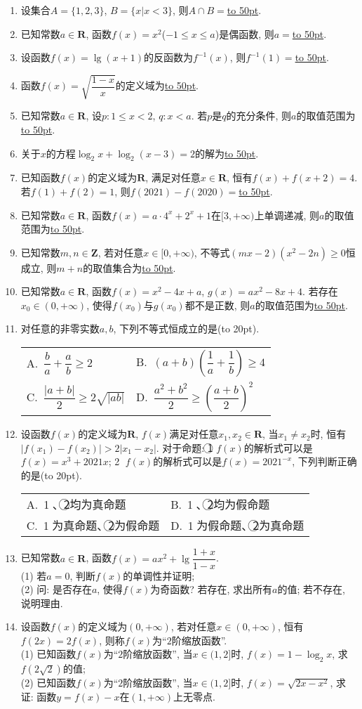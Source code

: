 \documentclass[10pt,a4paper]{article}
\newcommand{\blank}[1]{\underline{\hbox to #1pt{}}}
\newcommand{\bracket}[1]{(\hbox to #1pt{})}
\newcommand{\twoch}[4]{\par\begin{tabular}{p{.46\textwidth}p{.46\textwidth}}
A.~#1& B.~#2\\
C.~#3& D.~#4
\end{tabular}}
\begin{document}
\begin{enumerate}[1.]
\item 设集合$A=\{1,2,3\}$, $B=\{x|x<3\}$, 则$A\cap B=$\blank{50}.
\item 已知常数$a\in \mathbf{R}$, 函数$f(x)=x^2$($-1\le x\le a$)是偶函数, 则$a=$\blank{50}.
\item 设函数$f(x)=\lg (x+1)$的反函数为$f^{-1}(x)$, 则$f^{-1}(1)=$\blank{50}.
\item 函数$f(x)=\sqrt{\dfrac{1-x}x}$的定义域为\blank{50}.
\item 已知常数$a\in \mathbf{R}$, 设$p:1\le x<2$, $q:x<a$. 若$p$是$q$的充分条件, 则$a$的取值范围为\blank{50}.
\item 关于$x$的方程$\log_2 x+\log_2(x-3)=2$的解为\blank{50}.
\item 已知函数$f(x)$的定义域为$\mathbf{R}$, 满足对任意$x\in \mathbf{R}$, 恒有$f(x)+f(x+2)=4$. 若$f(1)+f(2)=1$, 则$f(2021)-f(2020)=$\blank{50}.
\item 已知常数$a\in \mathbf{R}$, 函数$f(x)=a\cdot 4^x+2^x+1$在$[3,+\infty)$上单调递减, 则$a$的取值范围为\blank{50}.
\item 已知常数$m,n\in \mathbf{Z}$, 若对任意$x\in [0,+\infty)$, 不等式$(mx-2)(x^2-2n)\ge 0$恒成立, 则$m+n$的取值集合为\blank{50}.
\item 已知常数$a\in \mathbf{R}$, 函数$f(x)=x^2-4x+a$, $g(x)=ax^2-8x+4$. 若存在$x_0\in (0,+\infty)$, 使得$f(x_0)$与$g(x_0)$都不是正数, 则$a$的取值范围为\blank{50}.
\item 对任意的非零实数$a,b$, 下列不等式恒成立的是\bracket{20}.
\twoch{$\dfrac ba+\dfrac ab\ge 2$}{$(a+b)(\dfrac 1a+\dfrac 1b)\ge 4$}{$\dfrac{|a+b|}2\ge 2\sqrt{|ab|}$}{$\dfrac{a^2+b^2}{2}\ge (\dfrac{a+b}2)^2$}
\item 设函数$f(x)$的定义域为$\mathbf{R}$, $f(x)$满足对任意$x_1,x_2\in \mathbf{R}$, 当$x_1\ne x_2$时, 恒有$|f(x_1)-f(x_2)|>2|x_1-x_2|$. 对于命题: \textcircled{1} $f(x)$的解析式可以是$f(x)=x^3+2021x$; \textcircled{2} $f(x)$的解析式可以是$f(x)=2021^{-x}$, 下列判断正确的是\bracket{20}.
\twoch{\textcircled{1}、\textcircled{2}均为真命题}{\textcircled{1}、\textcircled{2}均为假命题}{\textcircled{1}为真命题、\textcircled{2}为假命题}{\textcircled{1}为假命题、\textcircled{2}为真命题}
\item 已知常数$a\in \mathbf{R}$, 函数$f(x)=ax^2+\lg \dfrac{1+x}{1-x}$.\\
(1) 若$a=0$, 判断$f(x)$的单调性并证明;\\
(2) 问: 是否存在$a$, 使得$f(x)$为奇函数? 若存在, 求出所有$a$的值; 若不存在, 说明理由.
\item 设函数$f(x)$的定义域为$(0,+\infty)$, 若对任意$x\in (0,+\infty)$, 恒有$f(2x)=2f(x)$, 则称$f(x)$为``$2$阶缩放函数''.\\
(1) 已知函数$f(x)$为``$2$阶缩放函数'', 当$x\in (1,2]$时, $f(x)=1-\log_2 x$, 求$f(2\sqrt{2})$的值;\\
(2) 已知函数$f(x)$为``$2$阶缩放函数'', 当$x\in (1,2]$时, $f(x)=\sqrt{2x-x^2}$, 求证: 函数$y=f(x)-x$在$(1,+\infty)$上无零点.


\end{enumerate}
\end{document}
